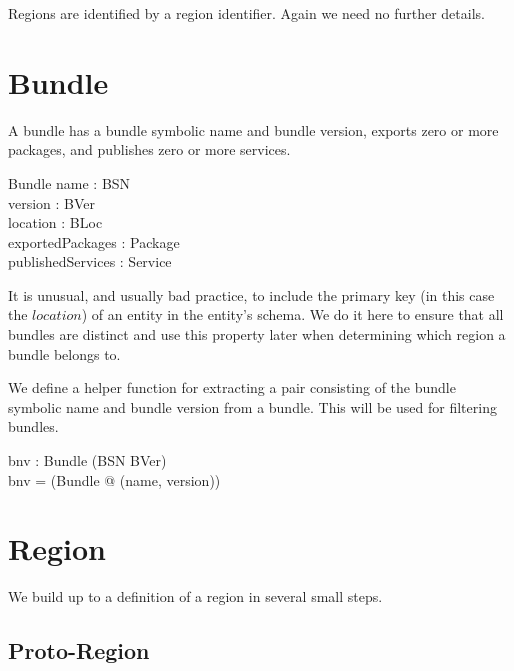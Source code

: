 \documentclass[a4paper,9pt]{article}
\begin{document}
Regions are identified by a region identifier. Again we need no further details.
\begin{zed}
  [RId]
\end{zed}

\clearpage
\section{Bundle}
\label{cha:bundle}

A bundle has a bundle symbolic name and bundle version, exports zero or more packages, and
publishes zero or more services.

\begin{schema}{Bundle}
  name : BSN \\
  version : BVer \\
  location : BLoc \\
  exportedPackages : \power Package \\
  publishedServices : \power Service \\
\end{schema}
It is unusual, and usually bad practice, to include the primary key (in this case the $location$) of
an entity in the entity's schema.
We do it here to ensure that all bundles are
distinct and use this property later when determining which region a bundle belongs to.

We define a helper function for extracting a pair consisting of the bundle symbolic name and bundle
version from a bundle. This will be used for filtering bundles.
\begin{axdef}
  bnv : Bundle \fun (BSN \cross BVer) \\
\where
  bnv =  (\lambda Bundle @ (name, version)) \\
\end{axdef}

\clearpage
\section{Region}
\label{cha:region}

We build up to a definition of a region in several small steps.

\subsection{Proto-Region}
\end{document}
